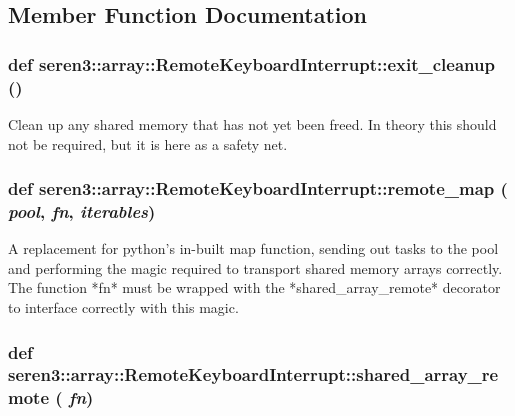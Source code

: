 \subsection{Member Function Documentation}
\hypertarget{classseren3_1_1array_1_1RemoteKeyboardInterrupt_a07c542d0d324f612b172cee29290c4f3}{
\subsubsection[{exit\_\-cleanup}]{\setlength{\rightskip}{0pt plus 5cm}def seren3::array::RemoteKeyboardInterrupt::exit\_\-cleanup ()}}
\label{classseren3_1_1array_1_1RemoteKeyboardInterrupt_a07c542d0d324f612b172cee29290c4f3}
\begin{DoxyVerb}Clean up any shared memory that has not yet been freed. In
theory this should not be required, but it is here as a safety
net.\end{DoxyVerb}
 \hypertarget{classseren3_1_1array_1_1RemoteKeyboardInterrupt_aff7e4bd891bea9300aa525620a14e490}{
\subsubsection[{remote\_\-map}]{\setlength{\rightskip}{0pt plus 5cm}def seren3::array::RemoteKeyboardInterrupt::remote\_\-map ( {\em pool}, \/   {\em fn}, \/   {\em iterables})}}
\label{classseren3_1_1array_1_1RemoteKeyboardInterrupt_aff7e4bd891bea9300aa525620a14e490}
\begin{DoxyVerb}A replacement for python's in-built map function, sending out tasks
to the pool and performing the magic required to transport shared memory arrays
correctly. The function *fn* must be wrapped with the *shared_array_remote*
decorator to interface correctly with this magic.\end{DoxyVerb}
 \hypertarget{classseren3_1_1array_1_1RemoteKeyboardInterrupt_a465c9a54d5b8b38699014c9d4dca8b35}{
\subsubsection[{shared\_\-array\_\-remote}]{\setlength{\rightskip}{0pt plus 5cm}def seren3::array::RemoteKeyboardInterrupt::shared\_\-array\_\-remote ( {\em fn})}}

